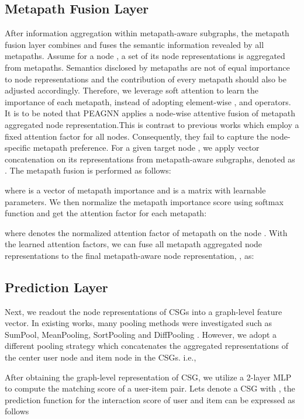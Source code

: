 \documentclass[runningheads, envcountsame, a4paper]{llncs}
\begin{document}
\subsection{Metapath Fusion Layer} 
After information aggregation within metapath-aware subgraphs,
the metapath fusion layer combines and fuses the semantic information revealed by all metapaths. 
Assume for a node , a set of its node representations  is aggregated from  metapaths.
Semantics disclosed by metapaths are not of equal importance to node representations and the contribution of every metapath should also be adjusted accordingly. Therefore, we leverage soft attention to learn the importance of each metapath, instead of adopting element-wise ,  and  operators.
It is to be noted that PEAGNN applies a node-wise attentive fusion of metapath aggregated node representation.This is contrast to previous works which employ a fixed attention factor for all nodes. Consequently, they fail to capture the node-specific metapath preference.
For a given target node , we apply vector concatenation on its representations from  metapath-aware subgraphs, denoted as .
The metapath fusion is performed as follows:

where  is a vector of metapath importance and  is a matrix with learnable parameters. We then normalize the metapath importance score using softmax function and get the attention factor for each metapath:

where  denotes the normalized attention factor of metapath  on the node .
With the learned attention factors, we can fuse all metapath aggregated node representations to the final metapath-aware node representation, , as:
 \vspace{-2mm}

\subsection{Prediction Layer}
Next, we readout the node representations of CSGs into a graph-level feature vector. 
In existing works, many pooling methods were investigated such as SumPool, MeanPooling, SortPooling \cite{zhang2018end} and DiffPooling \cite{ying2018hierarchical}. 
However, we adopt a different pooling strategy which concatenates the aggregated representations of the center user node  and item node  in the CSGs. i.e.,


After obtaining the graph-level representation of CSG, we utilize a 2-layer MLP to compute the matching score of a user-item pair. Lets denote a CSG with , the prediction function for the interaction score of user  and item  can be expressed as follows
\end{document}
